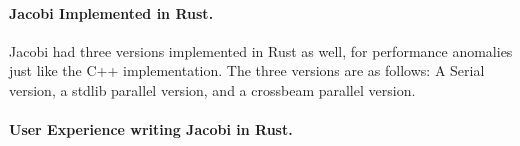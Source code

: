 \paragraph{Jacobi Implemented in Rust.}
Jacobi had three versions implemented in Rust as well, for performance anomalies
just like the C++ implementation. The three versions are as follows: A Serial
version, a stdlib parallel version, and a crossbeam parallel version.

\paragraph{User Experience writing Jacobi in Rust.}

